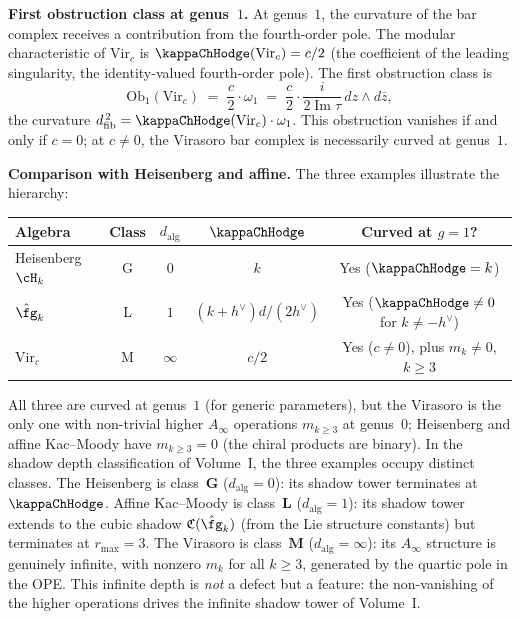 \begin{example}
\smallskip\noindent
\textbf{First obstruction class at genus~$1$.}
At genus~$1$, the curvature of the bar complex receives a
contribution from the fourth-order pole. The modular
characteristic of $\mathrm{Vir}_c$ is $\kappaChHodge(\mathrm{Vir}_c) = c/2$
(the coefficient of the leading singularity, the identity-valued
fourth-order pole). The first obstruction class is
\begin{equation}\label{eq:virasoro-obstruction}
 \mathrm{Ob}_1(\mathrm{Vir}_c)
 \;=\;
 \frac{c}{2} \cdot \omega_1
 \;=\;
 \frac{c}{2} \cdot
 \frac{i}{2\operatorname{Im}\tau}\, dz \wedge d\bar z,
\end{equation}
the curvature $\dfib^{\,2} = \kappaChHodge(\mathrm{Vir}_c)\cdot\omega_1$.
This obstruction vanishes if and only if $c = 0$; at $c \neq 0$,
the Virasoro bar complex is necessarily curved at genus~$1$.

\smallskip\noindent
\textbf{Comparison with Heisenberg and affine.}
The three examples illustrate the hierarchy:
\begin{center}
\renewcommand{\arraystretch}{1.3}
\begin{tabular}{lcccc}
\textbf{Algebra} & \textbf{Class} & $d_{\mathrm{alg}}$ & $\kappaChHodge$ &
 \textbf{Curved at $g=1$?} \\
\hline
Heisenberg $\cH_k$ & G & $0$ & $k$ & Yes ($\kappaChHodge = k$) \\
$\hat\fg_k$ & L & $1$ & $(k+h^\vee)d/(2h^\vee)$ &
 Yes ($\kappaChHodge \neq 0$ for $k \neq -h^\vee$) \\
$\mathrm{Vir}_c$ & M & $\infty$ & $c/2$ & Yes ($c \neq 0$),
 plus $m_k \neq 0$, $k \geq 3$
\end{tabular}
\end{center}
All three are curved at genus~$1$ (for generic parameters), but the
Virasoro is the only one with non-trivial higher $A_\infty$ operations
$m_{k \ge 3}$ at genus~$0$; Heisenberg and affine Kac--Moody have
$m_{k \ge 3} = 0$ (the chiral products are binary).
In the shadow depth classification of Volume~I,
the three examples occupy distinct classes. The Heisenberg is
class~$\mathbf{G}$ ($d_{\mathrm{alg}} = 0$): its shadow tower
terminates at~$\kappaChHodge$. Affine Kac--Moody is
class~$\mathbf{L}$ ($d_{\mathrm{alg}} = 1$): its shadow tower
extends to the cubic shadow $\mathfrak{C}(\hat\fg_k)$ (from the
Lie structure constants) but terminates at $r_{\max} = 3$.
The Virasoro is class~$\mathbf{M}$
($d_{\mathrm{alg}} = \infty$): its $A_\infty$ structure is genuinely
infinite, with nonzero $m_k$ for all $k \ge 3$, generated by the
quartic pole in the OPE. This infinite depth is \emph{not} a defect
but a feature: the non-vanishing of the higher operations drives the
infinite shadow tower of Volume~I.
\end{example}


